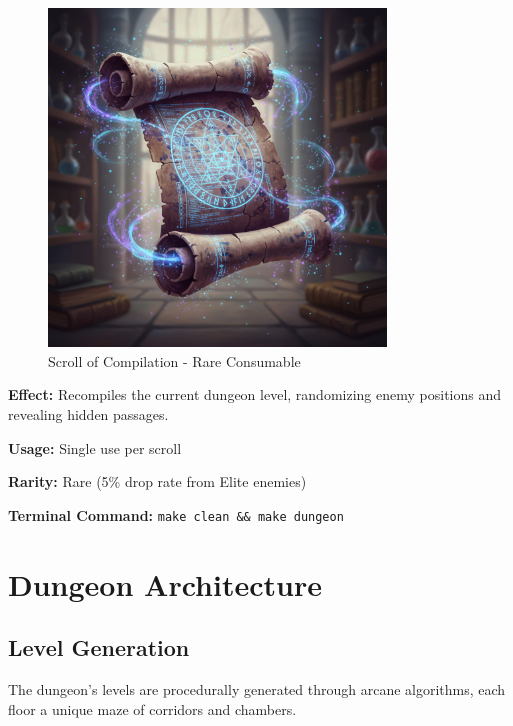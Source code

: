 \documentclass[11pt,a4paper]{book}
\begin{document}
\begin{figure}[H]
    \centering
    \includegraphics[width=0.8\textwidth]{images/scroll-compilation.png}
    \caption{Scroll of Compilation - Rare Consumable}
\end{figure}

\begin{mechanicsbox}
\textbf{Effect:} Recompiles the current dungeon level, randomizing enemy positions and revealing hidden passages.

\textbf{Usage:} Single use per scroll

\textbf{Rarity:} Rare (5\% drop rate from Elite enemies)

\textbf{Terminal Command:} \texttt{make clean \&\& make dungeon}
\end{mechanicsbox}

\chapter{Dungeon Architecture}

\section{Level Generation}

The dungeon's levels are procedurally generated through arcane algorithms, each floor a unique maze of corridors and chambers.
\end{document}
